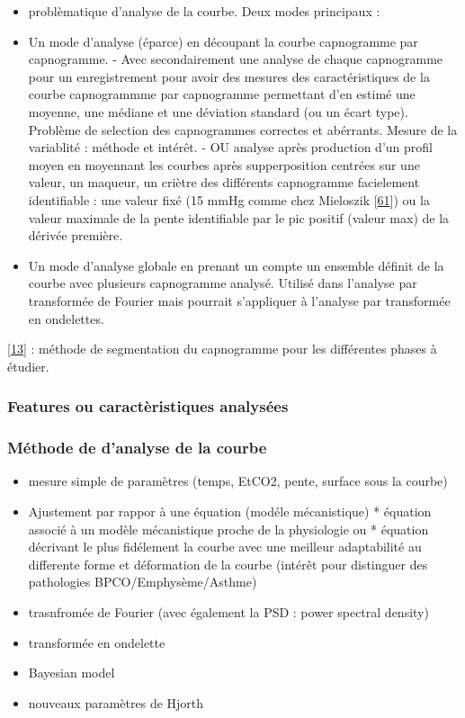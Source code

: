\documentclass[12pt,]{article}
\providecommand{\tightlist}{%
  \setlength{\itemsep}{0pt}\setlength{\parskip}{0pt}}
\begin{document}
\begin{itemize}
\item
  problèmatique d'analyse de la courbe. Deux modes principaux :
\item
  Un mode d'analyse (éparce) en découpant la courbe capnogramme par
  capnogramme. - Avec secondairement une analyse de chaque capnogramme
  pour un enregistrement pour avoir des mesures des caractéristiques de
  la courbe capnogrammme par capnogramme permettant d'en estimé une
  moyenne, une médiane et une déviation standard (ou un écart type).
  Problème de selection des capnogrammes correctes et abérrants. Mesure
  de la variablité : méthode et intérêt. - OU analyse après production
  d'un profil moyen en moyennant les courbes après supperposition
  centrées sur une valeur, un maqueur, un criètre des différents
  capnogramme facielement identifiable : une valeur fixé (15 mmHg comme
  chez Mieloszik
  {[}\protect\hyperlink{ref-mieloszyk2014automated}{61}{]}) ou la valeur
  maximale de la pente identifiable par le pic positif (valeur max) de
  la dérivée première.
\item
  Un mode d'analyse globale en prenant un compte un ensemble définit de
  la courbe avec plusieurs capnogramme analysé. Utilisé dans l'analyse
  par transformée de Fourier mais pourrait s'appliquer à l'analyse par
  transformée en ondelettes.
\end{itemize}

{[}\protect\hyperlink{ref-roy2007calculating}{13}{]} : méthode de
segmentation du capnogramme pour les différentes phases à étudier.

\hypertarget{features-ou-caracteristiques-analysees}{%
\subsubsection{Features ou caractèristiques
analysées}\label{features-ou-caracteristiques-analysees}}

\hypertarget{methode-de-danalyse-de-la-courbe}{%
\subsubsection{Méthode de d'analyse de la
courbe}\label{methode-de-danalyse-de-la-courbe}}

\begin{itemize}
\tightlist
\item
  mesure simple de paramètres (temps, EtCO2, pente, surface sous la
  courbe)
\item
  Ajustement par rappor à une équation (modéle mécanistique) * équation
  associé à un modèle mécanistique proche de la physiologie ou *
  équation décrivant le plus fidélement la courbe avec une meilleur
  adaptabilité au differente forme et déformation de la courbe (intérêt
  pour distinguer des pathologies BPCO/Emphysème/Asthme)
\item
  trasnfromée de Fourier (avec également la PSD : power spectral
  density)
\item
  transformée en ondelette
\item
  Bayesian model
\item
  nouveaux paramètres de Hjorth
\end{itemize}
\end{document}
